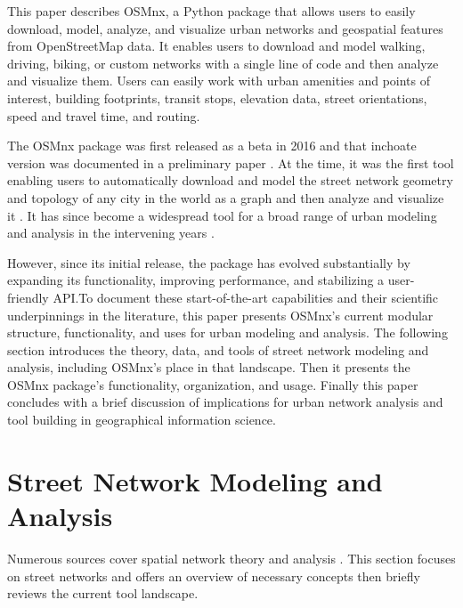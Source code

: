\documentclass[12pt,letterpaper]{article} %
\begin{document}
This paper describes OSMnx, a Python package that allows users to easily download, model, analyze, and visualize urban networks and geospatial features from OpenStreetMap data. It enables users to download and model walking, driving, biking, or custom networks with a single line of code and then analyze and visualize them. Users can easily work with urban amenities and points of interest, building footprints, transit stops, elevation data, street orientations, speed and travel time, and routing.

The OSMnx package was first released as a beta in 2016 and that inchoate version was documented in a preliminary paper \citep{boeing_osmnx:_2017}. At the time, it was the first tool enabling users to automatically download and model the street network geometry and topology of any city in the world as a graph and then analyze and visualize it \citep{boeing_right_2020}. It has since become a widespread tool for a broad range of urban modeling and analysis in the intervening years \citep[e.g.,][]{coutrot_entropy_2022,dacci_signature_2019,feng_spatial_2020,gervasoni_calculating_2017,liao_disparities_2020,natera_orozco_data-driven_2020,yin_multi-task_2020,young_automatic_2020}.

However, since its initial release, the package has evolved substantially by expanding its functionality, improving performance, and stabilizing a user-friendly API.\@ To document these start-of-the-art capabilities and their scientific underpinnings in the literature, this paper presents OSMnx's current modular structure, functionality, and uses for urban modeling and analysis. The following section introduces the theory, data, and tools of street network modeling and analysis, including OSMnx's place in that landscape. Then it presents the OSMnx package's functionality, organization, and usage. Finally this paper concludes with a brief discussion of implications for urban network analysis and tool building in geographical information science.

\section{Street Network Modeling and Analysis}

Numerous sources cover spatial network theory and analysis \citep[e.g.,][]{tinkler_graph_1979,barnes_graph_1983,gastner_spatial_2006,barthelemy_spatial_2011,ducruet_spatial_2014,fischer_spatial_2014,marshall_street_2018}. This section focuses on street networks and offers an overview of necessary concepts then briefly reviews the current tool landscape.
\end{document}
